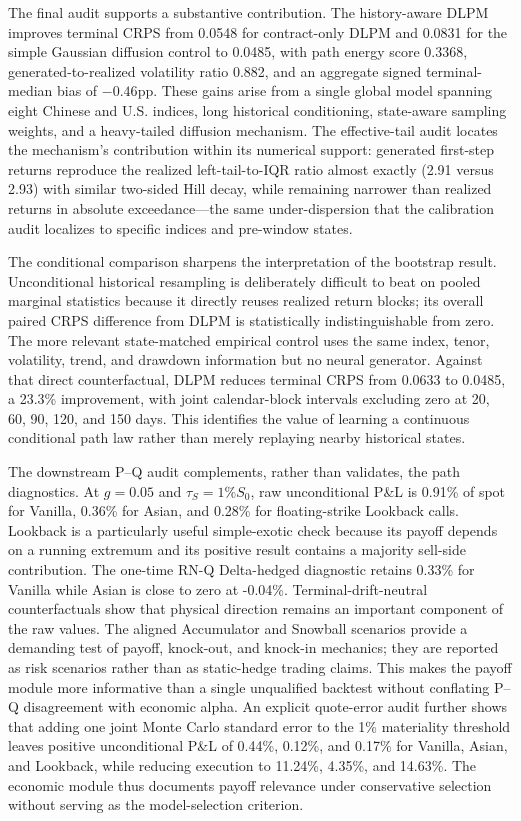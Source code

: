 ﻿\documentclass[12pt,letterpaper]{article}
\begin{document}
The final audit supports a substantive contribution. The history-aware DLPM
improves terminal CRPS from 0.0548 for contract-only DLPM and 0.0831 for the
simple Gaussian diffusion control to 0.0485, with path energy score 0.3368,
generated-to-realized volatility ratio 0.882, and an aggregate signed
terminal-median bias of $-0.46$pp. These gains arise from a single global
model spanning eight Chinese and U.S. indices, long historical conditioning,
state-aware sampling weights, and a heavy-tailed diffusion mechanism. The
effective-tail audit locates the mechanism's contribution within its
numerical support: generated first-step returns reproduce the realized
left-tail-to-IQR ratio almost exactly (2.91 versus 2.93) with similar
two-sided Hill decay, while remaining narrower than realized returns in
absolute exceedance---the same under-dispersion that the calibration audit
localizes to specific indices and pre-window states.

The conditional comparison sharpens the interpretation of the bootstrap
result. Unconditional historical resampling is deliberately difficult to beat
on pooled marginal statistics because it directly reuses realized return
blocks; its overall paired CRPS difference from DLPM is statistically
indistinguishable from zero. The more relevant state-matched empirical control
uses the same index, tenor, volatility, trend, and drawdown information but no
neural generator. Against that direct counterfactual, DLPM reduces terminal
CRPS from 0.0633 to 0.0485, a 23.3\% improvement, with joint calendar-block
intervals excluding zero at 20, 60, 90, 120, and 150 days. This identifies the
value of learning a continuous conditional path law rather than merely
replaying nearby historical states.

The downstream P--Q audit complements, rather than validates, the path
diagnostics. At $g=0.05$ and $\tau_S=1\%S_0$, raw unconditional P\&L is
0.91\% of spot for Vanilla, 0.36\% for Asian, and 0.28\% for floating-strike
Lookback calls. Lookback is a particularly useful simple-exotic check because
its payoff depends on a running extremum and its positive result contains a
majority sell-side contribution. The one-time RN-Q Delta-hedged diagnostic
retains 0.33\% for Vanilla while Asian is close to zero at -0.04\%.
Terminal-drift-neutral counterfactuals show that physical direction remains an
important component of the raw values. The aligned Accumulator and Snowball
scenarios provide a demanding test of payoff, knock-out, and knock-in
mechanics; they are reported as risk scenarios rather than as static-hedge
trading claims. This makes the payoff module more informative than a single
unqualified backtest without conflating P--Q disagreement with economic alpha.
An explicit quote-error audit further shows that adding one joint Monte Carlo
standard error to the 1\% materiality threshold leaves positive unconditional
P\&L of 0.44\%, 0.12\%, and 0.17\% for Vanilla, Asian, and Lookback, while
reducing execution to 11.24\%, 4.35\%, and 14.63\%. The economic module thus
documents payoff relevance under conservative selection without serving as
the model-selection criterion.
\end{document}
